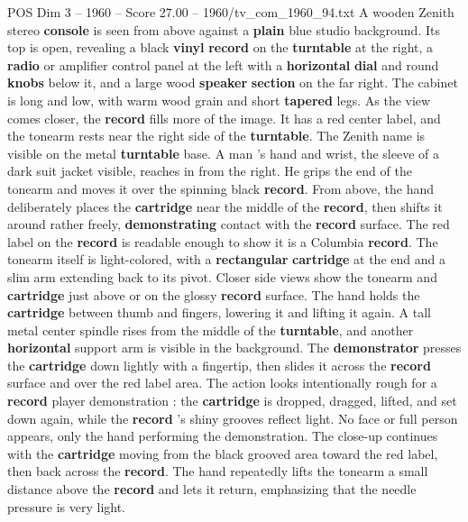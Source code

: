 \begin{textsample}{POS Dim 3 – 1960 – Score 27.00 – 1960/tv\_com\_1960\_94.txt}  \label{ex:f3_pos_021}
A wooden Zenith stereo \textbf{console} is seen from above against a \textbf{plain} blue studio background.
Its top is open, revealing a black \textbf{vinyl} \textbf{record} on the \textbf{turntable} at the right, a \textbf{radio} or amplifier control panel at the left with a \textbf{horizontal} \textbf{dial} and round \textbf{knobs} below it, and a large wood \textbf{speaker} \textbf{section} on the far right.
The cabinet is long and low, with warm wood grain and short \textbf{tapered} legs.
As the view comes closer, the \textbf{record} fills more of the image.
It has a red center label, and the tonearm rests near the right side of the \textbf{turntable}.
The Zenith name is visible on the metal \textbf{turntable} base.
A man ’s hand and wrist, the sleeve of a dark suit jacket visible, reaches in from the right.
He grips the end of the tonearm and moves it over the spinning black \textbf{record}.
From above, the hand deliberately places the \textbf{cartridge} near the middle of the \textbf{record}, then shifts it around rather freely, \textbf{demonstrating} contact with the \textbf{record} surface.
The red label on the \textbf{record} is readable enough to show it is a Columbia \textbf{record}.
The tonearm itself is light-colored, with a \textbf{rectangular} \textbf{cartridge} at the end and a slim arm extending back to its pivot.
Closer side views show the tonearm and \textbf{cartridge} just above or on the glossy \textbf{record} surface.
The hand holds the \textbf{cartridge} between thumb and fingers, lowering it and lifting it again.
A tall metal center spindle rises from the middle of the \textbf{turntable}, and another \textbf{horizontal} support arm is visible in the background.
The \textbf{demonstrator} presses the \textbf{cartridge} down lightly with a fingertip, then slides it across the \textbf{record} surface and over the red label area.
The action looks intentionally rough for a \textbf{record} player demonstration : the \textbf{cartridge} is dropped, dragged, lifted, and set down again, while the \textbf{record} ’s shiny grooves reflect light.
No face or full person appears, only the hand performing the demonstration.
The close-up continues with the \textbf{cartridge} moving from the black grooved area toward the red label, then back across the \textbf{record}.
The hand repeatedly lifts the tonearm a small distance above the \textbf{record} and lets it return, emphasizing that the needle pressure is very light.

\end{textsample}
